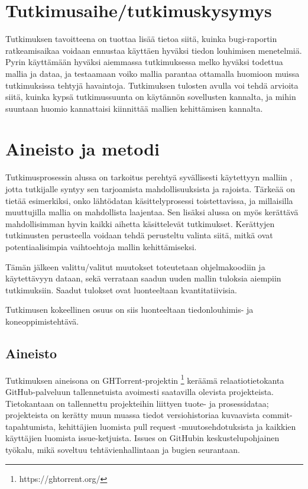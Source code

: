 \documentclass[utf8]{gradu3}
\begin{document}
\chapter{Tutkimusaihe/tutkimuskysymys}
Tutkimuksen tavoitteena on tuottaa lisää tietoa siitä, kuinka bugi-raportin
ratkeamisaikaa voidaan ennustaa käyttäen hyväksi tiedon louhimisen menetelmiä.
Pyrin käyttämään hyväksi aiemmassa tutkimuksessa \parencite{riivo-2016} melko
hyväksi todettua mallia ja dataa, ja testaamaan voiko mallia parantaa ottamalla
huomioon muissa tutkimuksissa tehtyjä havaintoja. Tutkimuksen tulosten avulla
voi tehdä arvioita siitä, kuinka kypsä tutkimussuunta on käytännön sovellusten
kannalta, ja mihin suuntaan huomio kannattaisi kiinnittää mallien kehittämisen
kannalta.

\chapter{Aineisto ja metodi}
Tutkimusprosessin alussa on tarkoitus perehtyä syvällisesti käytettyyn malliin
\parencite{riivo-2016}, jotta tutkijalle syntyy sen tarjoamista
mahdollisuuksista ja rajoista. Tärkeää on tietää esimerkiksi, onko lähtödatan
käsittelyprosessi toistettavissa, ja millaisilla muuttujilla mallia on
mahdollista laajentaa. Sen lisäksi alussa on myös kerättävä mahdollisimman hyvin
kaikki aihetta käsittelevät tutkimukset. Kerättyjen tutkimusten perusteella
voidaan tehdä perusteltu valinta siitä, mitkä ovat potentiaalisimpia
vaihtoehtoja mallin kehittämiseksi.

Tämän jälkeen valittu/valitut muutokset toteutetaan ohjelmakoodiin ja
käytettävyyn dataan, sekä verrataan saadun uuden mallin tuloksia aiempiin
tutkimuksiin. Saadut tulokset ovat luonteeltaan kvantitatiivisia. 

Tutkimusen kokeellinen osuus on siis luonteeltaan tiedonlouhimis- ja
koneoppimistehtävä.

\section{Aineisto}
Tutkimuksen aineisona on GHTorrent-projektin \footnote{https://ghtorrent.org/}
\parencite{Gousi13} keräämä relaatiotietokanta GitHub-palveluun tallennetuista
avoimesti saatavilla olevista projekteista. Tietokantaan on tallennettu
projekteihin liittyen tuote- ja prosessidataa; projekteista on kerätty muun
muassa tiedot versiohistoriaa kuvaavista commit-tapahtumista, kehittäjien
luomista pull request -muutosehdotuksista ja kaikkien käyttäjien luomista
issue-ketjuista. Issues on GitHubin keskustelupohjainen työkalu, mikä soveltuu
tehtävienhallintaan ja bugien seurantaan.
\end{document}
